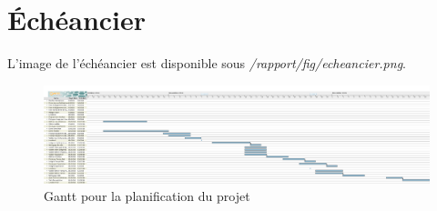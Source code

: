 %

\chapter{Échéancier}
\label{s:echeancier}

L'image de l'\'ech\'eancier est disponible sous \textit{/rapport/fig/echeancier.png}.

\begin{figure}[htpb]
    \centering
    \includegraphics[scale=0.20, angle=90]{fig/echeancier.png}
    \caption{Gantt pour la planification du projet}
    \label{fig:echeancier}
\end{figure}
